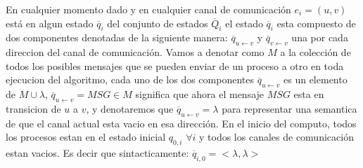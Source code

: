 \documentclass[10pt]{report}
\begin{document}
{    En cualquier momento dado y en cualquier canal de comunicación $e_{i}=(u,v)$ está en algun estado
    $\overline{q}_{i}$ del conjunto de estados $\overline{Q}_{i}$
    el estado $\overline{q}_{i}$ esta compuesto de dos componentes denotadas de la siguiente manera:
    $\overline{q}_{u\leftarrow v}$ y $\overline{q}_{v\leftarrow v}$ una por cada direccion del canal
    de comunicación.
    Vamos a denotar como $M$ a la colección de todos los posibles mensajes que se pueden enviar de un proceso a otro en toda ejecucion del algoritmo,
    \space cada uno de los dos componentes $\overline{q}_{u \leftarrow v}$ es un elemento de $M \cup \lambda$,
    $\overline{q}_{u\leftarrow v} = MSG\in M$ significa que ahora el mensaje $MSG$ esta en transicion de
    $u$ a $v$, y denotaremos que $\overline{q}_{u\leftarrow v} = \lambda$ para representar una semantica de que
    el canal actual esta vacio en esa dirección.
    En el inicio del computo, todos los procesos estan en el estado inicial $q_{0,i}$ $\forall i$
    y todos los canales de comunicación estan vacios.
    Es decir que sintacticamente: $\overline{q}_{i,0} = <\lambda,\lambda>$
    \newline
}
\end{document}
